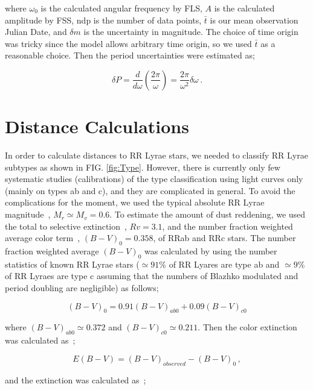 \documentclass[aps,prb,twocolumn,superscriptaddress]{revtex4-1}
\begin{document}
\noindent where $\omega_0$ is the calculated angular frequency by FLS, $A$ is the calculated amplitude by FSS, ndp is the number of data points, $\bar{t}$ is our mean observation Julian Date, and $\delta m$ is the uncertainty in magnitude. The choice of time origin was tricky since the model allows arbitrary time origin, so we used $\bar{t}$ as a reasonable choice. Then the period uncertainties were estimated as;


\begin{equation}
\label{PEE}
\delta P = \frac{d}{d\omega} \left(\frac{2\pi}{\omega} \right) = \frac{2\pi}{\omega^2} \delta \omega \, .
\end{equation}


\section{Distance Calculations}

In order to calculate distances to RR Lyrae stars, we needed to classify RR Lyrae subtypes as shown in FIG. \ref{fig:Type}. However, there is currently only few systematic studies (calibrations) of the type classification using light curves only (mainly on types ab and c), and they are complicated in general. To avoid the complications for the moment, we used the typical absolute RR Lyrae magnitude~\citep{PSdata}, $M_r \simeq M_v = 0.6$. To estimate the amount of dust reddening, we used the total to selective extinction~\citep{Rv}, $Rv=3.1$, and the number fraction weighted average color term~\citep{EBV}, $(B-V)_0 = 0.358$, of RRab and RRc stars. The number fraction weighted average $(B-V)_0$ was calculated by using the number statistics of known RR Lyrae stars ($\simeq91\%$ of RR Lyares are type ab and $\simeq9\%$ of RR Lyraes are type c assuming that the numbers of Blazhko modulated and period doubling are negligible) as follows;

\begin{equation}
\label{BV}
(B-V)_0 = 0.91(B-V)_{ab0} + 0.09(B-V)_{c0}
\end{equation}

\noindent where $(B-V)_{ab0} \simeq 0.372$ and $(B-V)_{c0} \simeq 0.211$. Then the color extinction was calculated as~\cite{Modern};

\begin{equation}
\label{EBV}
E(B-V) = (B-V)_{observed} - (B-V)_0 \, ,
\end{equation}

\noindent and the extinction was calculated as~\cite{Modern};
\end{document}
